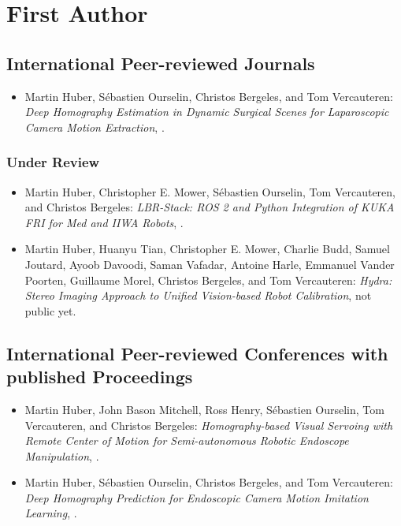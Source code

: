 \section*{First Author}

\subsection*{International Peer-reviewed Journals}
\begin{itemize}
    \item Martin Huber, S\'{e}bastien Ourselin, Christos Bergeles, and Tom Vercauteren: \textit{Deep Homography Estimation in Dynamic Surgical
Scenes for Laparoscopic Camera Motion Extraction}, \cite{huber2022deep}.
\end{itemize}

\subsubsection*{Under Review}
\begin{itemize}
    \item Martin Huber, Christopher E. Mower, S\'{e}bastien Ourselin, Tom Vercauteren, and Christos Bergeles: \textit{LBR-Stack: ROS 2 and Python Integration of KUKA FRI for Med and
IIWA Robots}, \cite{huber2023lbr}.
    \item Martin Huber, Huanyu Tian, Christopher E. Mower, Charlie Budd, Samuel Joutard, Ayoob Davoodi, Saman Vafadar, Antoine Harle, Emmanuel Vander Poorten, Guillaume Morel, Christos Bergeles, and Tom Vercauteren: \textit{Hydra: Stereo Imaging Approach to Unified Vision-based Robot Calibration}, not public yet.
\end{itemize}

\subsection*{International Peer-reviewed Conferences with published Proceedings}
\begin{itemize}
    \item Martin Huber, John Bason Mitchell, Ross Henry, S\'{e}bastien Ourselin, Tom Vercauteren, and Christos Bergeles: \textit{Homography-based Visual Servoing with Remote Center of Motion for Semi-autonomous Robotic Endoscope Manipulation}, \cite{huber2021homographybased}.
    \item Martin Huber, S\'{e}bastien Ourselin, Christos Bergeles, and Tom Vercauteren: \textit{Deep Homography Prediction for Endoscopic Camera Motion Imitation Learning}, \cite{huber2023deep}.
\end{itemize}

